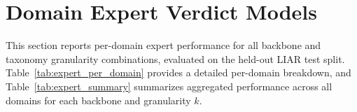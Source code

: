 \begin{table}[H]
\centering
\caption[DeepSeek domain routing confusion matrix for $k=13$.]{DeepSeek domain routing confusion matrix for $k=13$ (rows=true, cols=pred). Label order:
\texttt{[macro\_econ, jobs\_labor, business\_finance, cost\_of\_living\_housing, healthcare\_policy, public\_health\_crises, substances\_gambling, family\_demographics, law\_crime\_rights, institutions\_elections, foreign\_affairs\_security, environment\_energy\_infra, media\_meta]}.}
\label{tab:domain_cm_deepseek_k12}
\scriptsize
{}
\normalsize
\end{table}

\section{Domain Expert Verdict Models}

This section reports per-domain expert performance for all backbone and taxonomy granularity combinations, evaluated on the held-out LIAR test split. Table~\ref{tab:expert_per_domain} provides a detailed per-domain breakdown, and Table~\ref{tab:expert_summary} summarizes aggregated performance across all domains for each backbone and granularity $k$.

